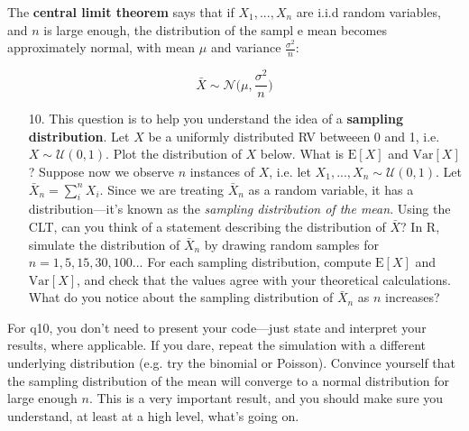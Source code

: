 \documentclass[10pt]{extarticle}
\newcommand{\E}{\text{E}}
\newcommand{\Var}{\text{Var}}
\begin{document}
\hfill 

The {\bf central limit theorem} says that if $X_1, ..., X_n$ are i.i.d random variables, and $n$ is large enough, the distribution of the sampl
e mean becomes approximately normal, with mean $\mu$ and variance $\frac{\sigma^2}{n}$:

$$\bar X \sim \mathcal N \bigg( \mu, \frac{\sigma^2}{n} \bigg)$$ 

\hfill 

\begin{itemize}

	\item[10.] This question is to help you understand the idea of a {\bf sampling distribution}. Let $X$ be a uniformly distributed RV betweeen 0 and 1, i.e. $X \sim \mathcal U(0,1)$. Plot the distribution of $X$ below. What is $\E[X]$ and $\Var[X]$? Suppose now we observe $n$ instances of $X$, i.e. let $X_1, ..., X_n \sim \mathcal U(0,1)$. Let $\bar X_n = \sum_i^n X_i$. Since we are treating $\bar X_n$ as a random variable, it has a distribution---it's known as the {\it sampling distribution of the mean}. Using the CLT, can you think of a statement describing the distribution of $\bar X$? In R, simulate the distribution of $\bar X_n$ by drawing random samples for $n = 1, 5, 15, 30, 100...$ For each sampling distribution, compute $\E[X]$ and $\Var[X]$, and check that the values agree with your theoretical calculations. What do you notice about the sampling distribution of $\bar X_n$ as $n$ increases?  

\end{itemize}

\hfill 

For q10, you don't need to present your code---just state and interpret your results, where applicable. If you dare, repeat the simulation with a different underlying distribution (e.g. try the binomial or Poisson).  Convince yourself that the sampling distribution of the mean will converge to a normal distribution for large enough $n$. This is a very important result, and you should make sure you understand, at least at a high level, what's going on.  

\hfill 
\end{document}
